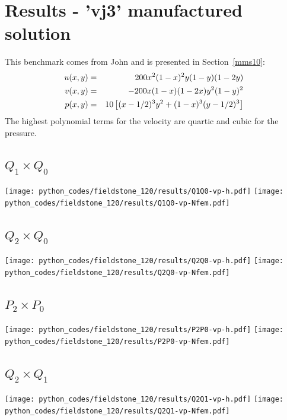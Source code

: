 \newpage
\section*{Results - 'vj3' manufactured solution}

This benchmark comes from John \etal \cite{jolm17} and is presented in Section~\ref{mms10}:
\begin{eqnarray}
u(x,y) &=& 200x^2(1-x)^2y(1-y)(1-2y) \nonumber\\
v(x,y) &=& -200x(1-x)(1-2x)y^2(1-y)^2 \nonumber\\
p(x,y) &=& 10\left[(x-1/2)^3y^2+(1-x)^3(y-1/2)^3 \right] \nonumber
\end{eqnarray}
The highest polynomial terms for the velocity are quartic and cubic for the pressure.

\subsection*{$Q_1\times Q_0$}
\begin{center}
\texttt{[image: python\_codes/fieldstone\_120/results/Q1Q0-vp-h.pdf]}
\texttt{[image: python\_codes/fieldstone\_120/results/Q1Q0-vp-Nfem.pdf]}
\end{center}

\subsection*{$Q_2\times Q_0$}
\begin{center}
\texttt{[image: python\_codes/fieldstone\_120/results/Q2Q0-vp-h.pdf]}
\texttt{[image: python\_codes/fieldstone\_120/results/Q2Q0-vp-Nfem.pdf]}
\end{center}

\subsection*{$P_2\times P_0$}
\begin{center}
\texttt{[image: python\_codes/fieldstone\_120/results/P2P0-vp-h.pdf]}
\texttt{[image: python\_codes/fieldstone\_120/results/P2P0-vp-Nfem.pdf]}
\end{center}

\subsection*{$Q_2\times Q_1$}
\begin{center}
\texttt{[image: python\_codes/fieldstone\_120/results/Q2Q1-vp-h.pdf]}
\texttt{[image: python\_codes/fieldstone\_120/results/Q2Q1-vp-Nfem.pdf]}
\end{center}

